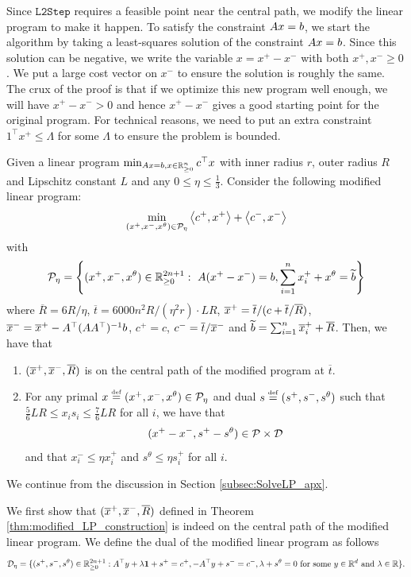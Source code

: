 Since $\mathtt{L2Step}$ requires a feasible point near the central
path, we modify the linear program to make it happen. To satisfy the
constraint $A x=b$, we start the algorithm by taking a least-squares
solution of the constraint $A x=b$. Since this solution can be
negative, we write the variable $x=x^{+}-x^{-}$ with both $x^{+},x^{-}\geq0$.
We put a large cost vector on $x^{-}$ to ensure the solution is roughly
the same. The crux of the proof is that if we optimize this new program
well enough, we will have $x^{+}-x^{-}>0$ and hence $x^{+}-x^{-}$
gives a good starting point for the original program. For technical
reasons, we need to put an extra constraint $1^{\top}x^{+}\leq\Lambda$
for some $\Lambda$ to ensure the problem is bounded.
\begin{thm}
\label{thm:modified_LP_construction}Given a linear program $\min_{A x=b,x\in\mathbb{R}^{n}_{\geq0}}c^{\top}x$
with inner radius $r$, outer radius $R$ and Lipschitz constant $L$
and any $0\leq\eta\leq\frac{1}{3}$. Consider the following modified
linear program:
\[
\min_{(x^{+},x^{-},x^{\theta})\in\mathcal{P}_{\eta}}\left\langle c^{+},x^{+}\right\rangle +\left\langle c^{-},x^{-}\right\rangle 
\]
with
\[
\PriR_{\eta}=\left\{ (x^{+},x^{-},x^{\theta})\in\R^{2n+1}_{\geq0}:\ \ma(x^{+}-x^{-})=b,\sum^{n}_{i=1}x^{+}_{i}+x^{\theta}=\widetilde{b}\right\} 
\]
where $\overline{R}=6R/\eta$, $\overline{t}=6000n^{2}R/(\eta^{2}r)\cdot LR$,
$\overline{x}^{+}=\overline{t}/(c+\overline{t}/\overline{R})$, $\overline{x}^{-}=\overline{x}^{+}-A^{\top}(AA^{\top})^{-1}b$,
$c^{+}=c$, $c^{-}=\overline{t}/\overline{x}^{-}$ and $\widetilde{b}=\sum^{n}_{i=1}\overline{x}^{+}_{i}+\overline{R}$.
Then, we have that
\begin{enumerate}
\item $(\overline{x}^{+},\overline{x}^{-},\overline{R})$ is on the central path of the modified
program at $\overline{t}$.
\item For any primal $x\stackrel{\mathrm{{\scriptscriptstyle def}}}{=}(x^{+},x^{-},x^{\theta})\in\mathcal{P}_{\eta}$ and
dual $s\stackrel{\mathrm{{\scriptscriptstyle def}}}{=}(s^{+},s^{-},s^{\theta})$ such that $\frac{5}{6}LR\leq x_{i}s_{i}\leq\frac{7}{6}LR$
for all $i$, we have that
\[
(x^{+}-x^{-},s^{+}-s^{\theta})\in\mathcal{P}\times\mathcal{D}
\]
and that $x^{-}_{i}\leq\eta x^{+}_{i}$ and $s^{\theta}\leq\eta s^{+}_{i}$
for all $i$.
\end{enumerate}
\end{thm}

We continue from the discussion in Section \ref{subsec:SolveLP_apx}.

We first show that $(\overline{x}^{+},\overline{x}^{-},\overline{R})$ defined in Theorem
\ref{thm:modified_LP_construction} is indeed on the central path
of the modified linear program. We define the dual of the modified
linear program as follows
\[
\mathcal{D}_{\eta}=\{(s^{+},s^{-},s^{\theta})\in\mathbb{R}^{2n+1}_{\geq0}:A^{\top}y+\lambda\mathbf{1}+s^{+}=c^{+},-A^{\top}y+s^{-}=c^{-},\lambda+s^{\theta}=0\text{ for some }y\in\mathbb{R}^{d}\text{ and }\lambda\in\mathbb{R}\}.
\]

